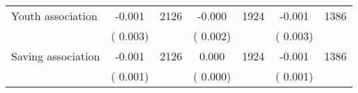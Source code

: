 \begin{tabular}{l*{6}{c}}
Youth association        &             -0.001      &       2126       &             -0.000      &       1924       &             -0.001      &       1386       \\
                       &       (       0.003)            &                               &       (       0.002)            &                               &       (       0.003)            &                               \\
Saving association        &             -0.001      &       2126       &              0.000      &       1924       &             -0.001      &       1386       \\
                       &       (       0.001)            &                               &       (       0.000)            &                               &       (       0.001)            &                               \\
\hline \end{tabular}